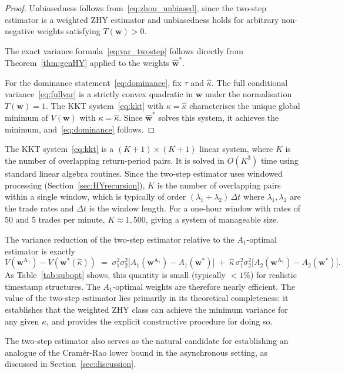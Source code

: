 \begin{proof}
Unbiasedness follows from~\eqref{eq:zhou_unbiased}, since the
two-step estimator is a weighted ZHY estimator and unbiasedness
holds for arbitrary non-negative weights satisfying
$T(\mathbf{w}) > 0$.

The exact variance formula~\eqref{eq:var_twostep} follows directly
from Theorem~\ref{thm:genHY} applied to the weights
$\hat{\mathbf{w}}^*$.

For the dominance statement~\eqref{eq:dominance}, fix
$\tau$ and $\hat\kappa$. The full conditional
variance~\eqref{eq:fullvar} is a strictly convex quadratic in
$\mathbf{w}$ under the normalisation $T(\mathbf{w}) = 1$. The
KKT system~\eqref{eq:kkt} with $\kappa = \hat\kappa$ characterises
the unique global minimum of $V(\mathbf{w})$ with
$\kappa = \hat\kappa$. Since $\hat{\mathbf{w}}^*$ solves
this system, it achieves the minimum, and~\eqref{eq:dominance}
follows.
\end{proof}

\begin{remark}
The KKT system~\eqref{eq:kkt} is a $(K+1)\times(K+1)$ linear
system, where $K$ is the number of overlapping return-period pairs.
It is solved in $O(K^3)$ time using standard linear algebra
routines. Since the two-step estimator uses windowed processing
(Section~\ref{sec:HYrecursion}), $K$ is the number of overlapping
pairs within a single window, which is typically of order
$(\lambda_1 + \lambda_2)\,\Delta t$ where $\lambda_1, \lambda_2$
are the trade rates and $\Delta t$ is the window length.
For a one-hour window with rates of 50 and 5 trades per minute,
$K \approx 1{,}500$, giving a system of manageable size.
\end{remark}

\begin{remark}
The variance reduction of the two-step estimator relative to the
$A_1$-optimal estimator is exactly
\begin{equation}\label{eq:reduction}
    V\!\left(\mathbf{w}^{\mathrm{A_1}}\right)
    - V\!\left(\mathbf{w}^*(\hat\kappa)\right)
    \;=\;
    \sigma_1^2\sigma_2^2
    \bigl[A_1(\mathbf{w}^{\mathrm{A_1}}) - A_1(\mathbf{w}^*)\bigr]
    \;+\;
    \hat\kappa\,\sigma_1^2\sigma_2^2
    \bigl[A_2(\mathbf{w}^{\mathrm{A_1}}) - A_2(\mathbf{w}^*)\bigr].
\end{equation}
As Table~\ref{tab:subopt} shows, this quantity is small (typically
$< 1\%$) for realistic timestamp structures. The $A_1$-optimal
weights are therefore nearly efficient. The value of the two-step
estimator lies primarily in its theoretical completeness: it
establishes that the weighted ZHY class can achieve the
minimum variance for any given $\kappa$, and provides the
explicit constructive procedure for doing so.

The two-step estimator also serves as the natural candidate for
establishing an analogue of the Cram\'{e}r-Rao lower bound in the
asynchronous setting, as discussed in Section~\ref{sec:discussion}.
\end{remark}

